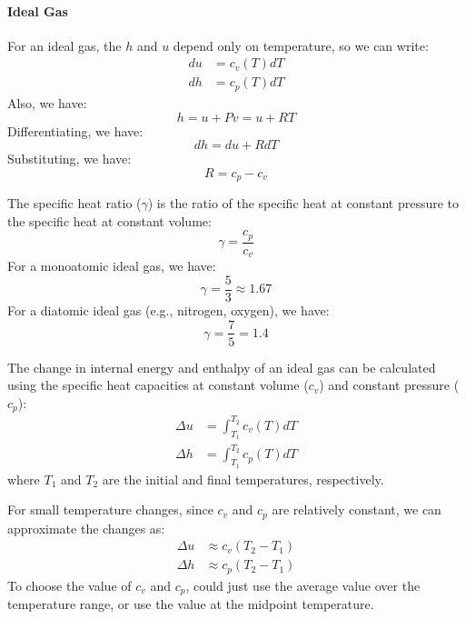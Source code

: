 \documentclass[11pt]{report}
\begin{document}
\paragraph{Ideal Gas} For an ideal gas, the $h$ and $u$ depend only on temperature, so we can write:
\begin{subequations}
\begin{align}
    du &= c_v(T) dT \\
    dh &= c_p(T) dT
\end{align}
\end{subequations}
Also, we have:
$$
    h = u + Pv = u + RT
$$
Differentiating, we have:
$$
    dh = du + R dT
$$
Substituting, we have:
\begin{equation}
    R = c_p - c_v
\end{equation}

\begin{definition}
    The specific heat ratio ($\gamma$) is the ratio of the specific heat at constant pressure to the specific heat at constant volume:
    \begin{equation}
        \gamma = \frac{c_p}{c_v}
    \end{equation}
    For a monoatomic ideal gas, we have:
    \begin{equation}
        \gamma = \frac{5}{3} \approx 1.67
    \end{equation}
    For a diatomic ideal gas (e.g., nitrogen, oxygen), we have:
    \begin{equation}
        \gamma = \frac{7}{5} = 1.4
    \end{equation}
\end{definition}

\begin{definition}
    The change in internal energy and enthalpy of an ideal gas can be calculated using the specific heat capacities at constant volume ($c_v$) and constant pressure ($c_p$):
    \begin{subequations}
    \begin{align}
        \Delta u &= \int_{T_1}^{T_2} c_v(T) dT \\
        \Delta h &= \int_{T_1}^{T_2} c_p(T) dT
    \end{align}
    \end{subequations}
    where $T_1$ and $T_2$ are the initial and final temperatures, respectively.

    For small temperature changes, since $c_v$ and $c_p$ are relatively constant, we can approximate the changes as:
    \begin{subequations}
        \begin{align}
            \Delta u &\approx c_v (T_2 - T_1) \\
            \Delta h &\approx c_p (T_2 - T_1)
        \end{align}
    \end{subequations}
    To choose the value of $c_v$ and $c_p$, could just use the average value over the temperature range, or use the value at the midpoint temperature.

\end{definition}
\end{document}
